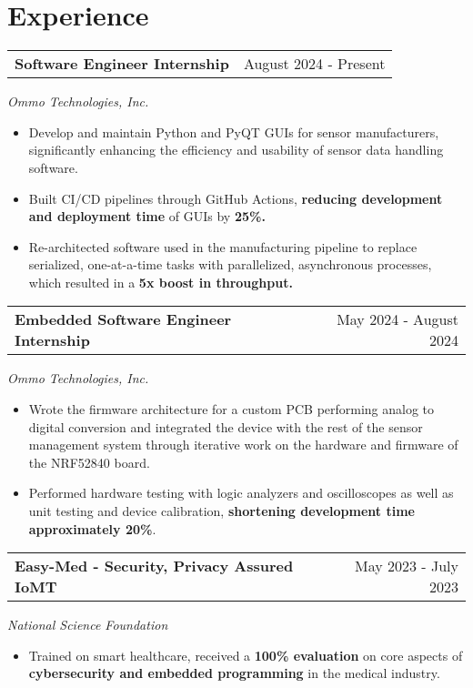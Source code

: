 \documentclass[a4paper,12pt]{article}
\begin{document}
\section{Experience}

\begin{tabularx}{\linewidth}{@{}Xr@{}}
\textbf{Software Engineer Internship} & \hfill August 2024 - Present
\end{tabularx}
\textit{Ommo Technologies, Inc.}
\vspace{-0.4em}
\begin{itemize}
    \item Develop and maintain Python and PyQT GUIs for sensor manufacturers, significantly enhancing the efficiency and usability of sensor data handling software.
    \item Built CI/CD pipelines through GitHub Actions, \textbf{reducing development and deployment time} of GUIs by \textbf{25\%.}
    \item Re-architected software used in the manufacturing pipeline to replace serialized, one-at-a-time tasks with parallelized, asynchronous processes, which resulted in a \textbf{5x boost in throughput.}
\end{itemize}

\begin{tabularx}{\linewidth}{@{}Xr@{}}
\textbf{Embedded Software Engineer Internship} & \hfill May 2024 - August 2024
\end{tabularx}
\textit{Ommo Technologies, Inc.}
\vspace{-0.4em}
\begin{itemize}
    \item Wrote the firmware architecture for a custom PCB performing analog to digital conversion and integrated the device with the rest of the sensor management system through iterative work on the hardware and firmware of the NRF52840 board.
    \item Performed hardware testing with logic analyzers and oscilloscopes as well as unit testing and device calibration, \textbf{shortening development time approximately 20\%}.
\end{itemize}

\begin{tabularx}{\linewidth}{@{}Xr@{}}
\textbf{Easy-Med - Security, Privacy Assured IoMT} & \hfill May 2023 - July 2023
\end{tabularx}
\textit{National Science Foundation}
\vspace{-0.4em}
\begin{itemize}
    \item Trained on smart healthcare, received a \textbf{100\% evaluation} on core aspects of \textbf{cybersecurity and embedded programming} in the medical industry.
\end{itemize}
\end{document}
